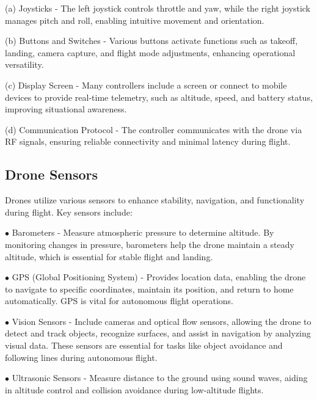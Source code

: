\documentclass[unnumsec,webpdf,modern,large]{mam-authoring-template}%
\begin{document}
(a) Joysticks - The left joystick controls throttle and yaw, while the right joystick manages pitch and roll, enabling intuitive movement and orientation.

(b) Buttons and Switches - Various buttons activate functions such as takeoff, landing, camera capture, and flight mode adjustments, enhancing operational versatility.

(c) Display Screen - Many controllers include a screen or connect to mobile devices to provide real-time telemetry, such as altitude, speed, and battery status, improving situational awareness.

(d) Communication Protocol - The controller communicates with the drone via RF signals, ensuring reliable connectivity and minimal latency during flight.


\subsection{Drone Sensors} \label{sec}

Drones utilize various sensors to enhance stability, navigation, and functionality during flight. Key sensors include:

\begin{description}

\item $\bullet$ Barometers - Measure atmospheric pressure to determine altitude. By monitoring changes in pressure, barometers help the drone maintain a steady altitude, which is essential for stable flight and landing.

\item $\bullet$ GPS (Global Positioning System) - Provides location data, enabling the drone to navigate to specific coordinates, maintain its position, and return to home automatically. GPS is vital for autonomous flight operations.

\item $\bullet$ Vision Sensors - Include cameras and optical flow sensors, allowing the drone to detect and track objects, recognize surfaces, and assist in navigation by analyzing visual data. These sensors are essential for tasks like object avoidance and following lines during autonomous flight.

\item $\bullet$ Ultrasonic Sensors - Measure distance to the ground using sound waves, aiding in altitude control and collision avoidance during low-altitude flights.

\end{description}
\end{document}
